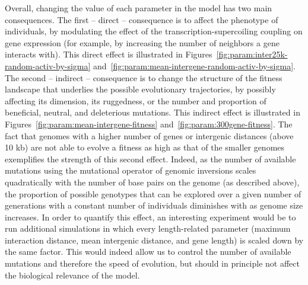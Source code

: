 Overall, changing the value of each parameter in the model has two main consequences.
The first -- direct -- consequence is to affect the phenotype of individuals, by modulating the effect of the transcription-supercoiling coupling on gene expression (for example, by increasing the number of neighbors a gene interacts with).
This direct effect is illustrated in Figures~\ref{fig:param:inter25k-random-activ-by-sigma} and~\ref{fig:param:mean-intergene-random-activ-by-sigma}.
The second -- indirect -- consequence is to change the structure of the fitness landscape that underlies the possible evolutionary trajectories, by possibly affecting its dimension, its ruggedness, or the number and proportion of beneficial, neutral, and deleterious mutations.
This indirect effect is illustrated in Figures~\ref{fig:param:mean-intergene-fitness} and~\ref{fig:param:300gene-fitness}.
The fact that genomes with a higher number of genes or intergenic distances (above 10 kb) are not able to evolve a fitness as high as that of the smaller genomes exemplifies the strength of this second effect.
Indeed, as the number of available mutations using the mutational operator of genomic inversions scales quadratically with the number of base pairs on the genome (as described above), the proportion of possible genotypes that can be explored over a given number of generations with a constant number of individuals diminishes with as genome size increases.
In order to quantify this effect, an interesting experiment would be to run additional simulations in which every length-related parameter (maximum interaction distance, mean intergenic distance, and gene length) is scaled down by the same factor.
This would indeed allow us to control the number of available mutations and therefore the speed of evolution, but should in principle not affect the biological relevance of the model.


